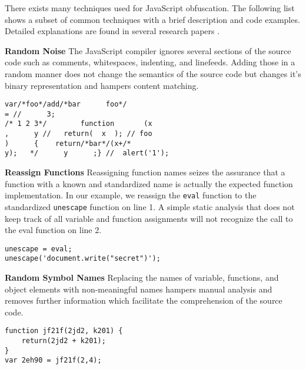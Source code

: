 	There exists many techniques used for JavaScript obfuscation. The following list shows a subset of common techniques with a brief description and code examples. Detailed explanations are found in several research papers \cite{caffinemonkey, Xu:2013:JMS:2435349.2435364, kim2011suspicious}.
	
	\def\leftside{0.475\textwidth}
	\def\rightside{0.475\textwidth}
	\begin{itemize}
		\begin{minipage}{\leftside}
			\item \textbf{Random Noise} The JavaScript compiler ignores several sections of the source code such as comments, whitespaces, indenting, and linefeeds. Adding those in a random manner does not change the semantics of the source code but changes it's binary representation and hampers content matching.
		\end{minipage} \hspace{1em}
		\begin{minipage}{\rightside}	
			\begin{lstlisting}
var/*foo*/add/*bar      foo*/
= //      3;
/* 1 2 3*/        function       (x
,      y //   return(  x  ); // foo
)      {    return/*bar*/(x+/*
y);   */      y      ;} //  alert('1');
\end{lstlisting}
		\end{minipage} 
		
		\begin{minipage}{\leftside}
			\item \textbf{Reassign Functions} Reassigning function names seizes the assurance that a function with a known and standardized name is actually the expected function implementation. In our example, we reassign the \texttt{eval} function to the standardized \texttt{unescape} function on line 1. A simple static analysis that does not keep track of all variable and function assignments will not recognize the call to the eval function on line 2.
		\end{minipage} \hspace{1em}
		\begin{minipage}{\rightside}	
			\begin{lstlisting}
unescape = eval;
unescape('document.write("secret")');
\end{lstlisting}
		\end{minipage} 
		
		\begin{minipage}{\leftside}
			\item \textbf{Random Symbol Names} Replacing the names of variable, functions, and object elements with non-meaningful names hampers manual analysis and removes further information which facilitate the comprehension of the source code.
		\end{minipage} \hspace{1em}
		\begin{minipage}{\rightside}	
			\begin{lstlisting}
function jf21f(2jd2, k201) {
	return(2jd2 + k201);
}
var 2eh90 = jf21f(2,4);
\end{lstlisting}
		\end{minipage} 	
		

\end{itemize}
